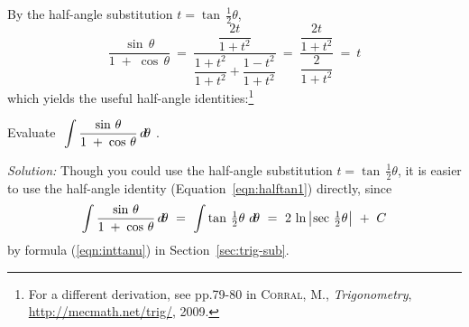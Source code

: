 By the half-angle substitution $t = \tan\,\tfrac{1}{2}\theta$,
\[
\frac{\sin\,\theta}{1 \;+\; \cos\,\theta} ~=~
\frac{\dfrac{2t}{1+t^2}}{\dfrac{1+t^2}{1+t^2} + \dfrac{1-t^2}{1+t^2}} ~=~
\frac{\dfrac{2t}{1+t^2}}{\dfrac{2}{1+t^2}} ~=~ t
\]
which yields the useful half-angle identities:\footnote{For a different
derivation, see pp.79-80 in \textsc{Corral, M.}, \emph{Trigonometry},
\url{http://mecmath.net/trig/}, 2009.}

\begin{exmp}\label{exmp:inthalfangle3}
\noindent Evaluate $~\displaystyle\int \frac{\sin\,\theta}{1 \;+\;
\cos\,\theta}\,d\!\theta~$.\vspace{1mm}
\par\noindent\emph{Solution:} Though you could use the half-angle substitution
$t = \tan\,\tfrac{1}{2}\theta$, it is easier to use the half-angle identity
(Equation~\ref{eqn:halftan1}) directly, since
\[
\int \frac{\sin\,\theta}{1 \;+\; \cos\,\theta}\,d\!\theta ~=~
\int \tan\,\tfrac{1}{2}\theta~d\!\theta ~=~
2\,\ln\,\bigl\lvert\mspace{1mu}\sec\,\tfrac{1}{2}\theta\mspace{1mu}\bigr\rvert ~+~ C
\]
by formula (\ref{eqn:inttanu}) in Section~\ref{sec:trig-sub}.
\end{exmp}\vspace{-2mm}
\divider
\newpage
\startexercises\label{sec6dot5}
